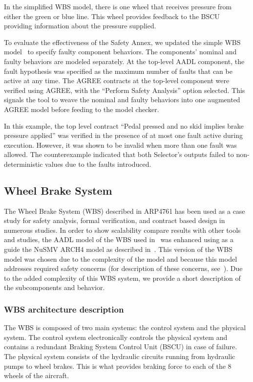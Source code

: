 In the simplified WBS model, there is one wheel that receives pressure from either the green or blue line. This wheel provides feedback to the BSCU providing information about the pressure supplied. 

To evaluate the effectiveness of the Safety Annex, we updated the simple WBS model~\cite{Stewart17:IMBSA} to specify faulty component behaviors. The components' nominal  and faulty behaviors are modeled separately. At the top-level AADL component, the fault hypothesis was specified as the maximum number of faults that can be active at any time. The AGREE contracts at the top-level component were verified using AGREE, with the ``Perform Safety Analysis'' option selected. This signals the tool to weave the nominal and faulty behaviors into one augmented AGREE model before feeding to the model checker.

In this example, the top level contract ``Pedal pressed and no skid implies brake pressure applied'' was verified in the presence of at most one fault active during execution.  However, it was shown to be invalid when more than one fault was allowed. The counterexample indicated that both Selector's outputs failed to non-deterministic values due to the faults introduced.
\fi


\subsection{Wheel Brake System}
The Wheel Brake System (WBS) described in ARP4761 has been used as a case study for safety analysis, formal verification, and contract based design in numerous studies. In order to show scalability compare results with other tools and studies, the AADL model of the WBS used in~\cite{Stewart17:IMBSA} was enhanced using as a guide the NuSMV ARCH4 model as described in~\cite{DBLP:conf/cav/BozzanoCPJKPRT15}. This version of the WBS model was chosen due to the complexity of the model and because this model addresses required safety concerns (for description of these concerns, see~\cite{DBLP:conf/cav/BozzanoCPJKPRT15}). Due to the added complexity of this WBS system, we provide a short description of the subcomponents and behavior. 

\subsubsection{WBS architecture description} 
The WBS is composed of two main systems: the control system and the physical system. The control system electronically controls the physical system and contains a redundant Braking System Control Unit (BSCU) in case of failure. The physical system consists of the hydraulic circuits running from hydraulic pumps to wheel brakes. This is what provides braking force to each of the 8 wheels of the aircraft. 

